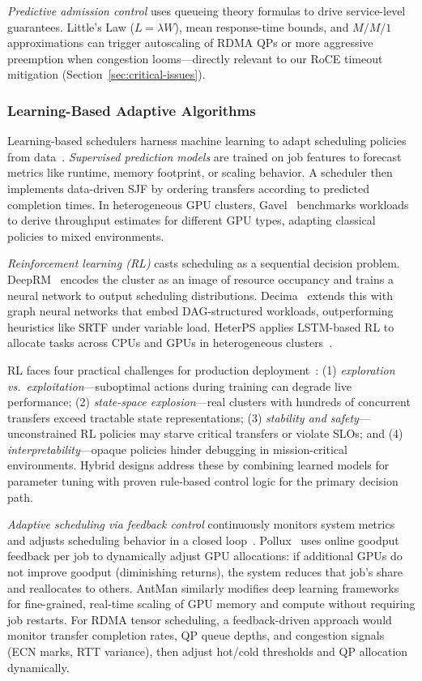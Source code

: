 \documentclass[11pt,letterpaper]{article}
\theoremstyle{definition}
\begin{document}
\emph{Predictive admission control} uses queueing theory formulas to drive service-level guarantees. Little's Law ($L = \lambda W$), mean response-time bounds, and $M/M/1$ approximations can trigger autoscaling of RDMA QPs or more aggressive preemption when congestion looms---directly relevant to our RoCE timeout mitigation (Section~\ref{sec:critical-issues}).

\subsubsection{Learning-Based Adaptive Algorithms}

Learning-based schedulers harness machine learning to adapt scheduling policies from data~\cite{gpu-scheduling-survey}. \emph{Supervised prediction models} are trained on job features to forecast metrics like runtime, memory footprint, or scaling behavior. A scheduler then implements data-driven SJF by ordering transfers according to predicted completion times. In heterogeneous GPU clusters, Gavel~\cite{gavel2020} benchmarks workloads to derive throughput estimates for different GPU types, adapting classical policies to mixed environments.

\emph{Reinforcement learning (RL)} casts scheduling as a sequential decision problem. DeepRM~\cite{deeprm2016} encodes the cluster as an image of resource occupancy and trains a neural network to output scheduling distributions. Decima~\cite{decima2019} extends this with graph neural networks that embed DAG-structured workloads, outperforming heuristics like SRTF under variable load. HeterPS applies LSTM-based RL to allocate tasks across CPUs and GPUs in heterogeneous clusters~\cite{gpu-scheduling-survey}.

RL faces four practical challenges for production deployment~\cite{gpu-scheduling-survey}: (1) \emph{exploration vs.\ exploitation}---suboptimal actions during training can degrade live performance; (2) \emph{state-space explosion}---real clusters with hundreds of concurrent transfers exceed tractable state representations; (3) \emph{stability and safety}---unconstrained RL policies may starve critical transfers or violate SLOs; and (4) \emph{interpretability}---opaque policies hinder debugging in mission-critical environments. Hybrid designs address these by combining learned models for parameter tuning with proven rule-based control logic for the primary decision path.

\emph{Adaptive scheduling via feedback control} continuously monitors system metrics and adjusts scheduling behavior in a closed loop~\cite{gpu-scheduling-survey}. Pollux~\cite{pollux2021} uses online goodput feedback per job to dynamically adjust GPU allocations: if additional GPUs do not improve goodput (diminishing returns), the system reduces that job's share and reallocates to others. AntMan similarly modifies deep learning frameworks for fine-grained, real-time scaling of GPU memory and compute without requiring job restarts. For RDMA tensor scheduling, a feedback-driven approach would monitor transfer completion rates, QP queue depths, and congestion signals (ECN marks, RTT variance), then adjust hot/cold thresholds and QP allocation dynamically.
\end{document}
